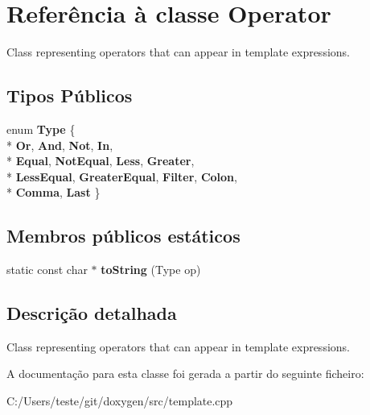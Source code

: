 \hypertarget{class_operator}{\section{Referência à classe Operator}
\label{class_operator}
}


Class representing operators that can appear in template expressions.  


\subsection*{Tipos Públicos}
\begin{DoxyCompactItemize}
\item 
enum {\bfseries Type} \{ \\*
{\bfseries Or}, 
{\bfseries And}, 
{\bfseries Not}, 
{\bfseries In}, 
\\*
{\bfseries Equal}, 
{\bfseries Not\-Equal}, 
{\bfseries Less}, 
{\bfseries Greater}, 
\\*
{\bfseries Less\-Equal}, 
{\bfseries Greater\-Equal}, 
{\bfseries Filter}, 
{\bfseries Colon}, 
\\*
{\bfseries Comma}, 
{\bfseries Last}
 \}
\end{DoxyCompactItemize}
\subsection*{Membros públicos estáticos}
\begin{DoxyCompactItemize}
\item 
\hypertarget{class_operator_a9d952536c7ca061f1dab292757c05875}{static const char $\ast$ {\bfseries to\-String} (Type op)}\label{class_operator_a9d952536c7ca061f1dab292757c05875}

\end{DoxyCompactItemize}


\subsection{Descrição detalhada}
Class representing operators that can appear in template expressions. 

A documentação para esta classe foi gerada a partir do seguinte ficheiro\-:\begin{DoxyCompactItemize}
\item 
C\-:/\-Users/teste/git/doxygen/src/template.\-cpp\end{DoxyCompactItemize}

